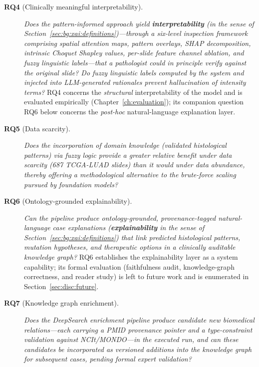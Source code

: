 \begin{description}
    \item[\textbf{RQ4} (Clinically meaningful interpretability).]
\emph{Does the pattern-informed approach yield
\textbf{interpretability} (in the sense of
Section~\ref{sec:bg:xai:definitions})---through a six-level
inspection framework comprising spatial attention maps, pattern
overlays, SHAP decomposition, intrinsic Choquet Shapley values,
per-slide feature channel ablation, and fuzzy linguistic
labels---that a pathologist could in principle verify against the
original slide?
Do fuzzy linguistic labels computed by the system and injected
into LLM-generated rationales prevent hallucination of intensity
terms?}
RQ4 concerns the \emph{structural} interpretability of the
model and is evaluated empirically
(Chapter~\ref{ch:evaluation}); its companion question
RQ6 below concerns the \emph{post-hoc} natural-language
explanation layer.
  \item[\textbf{RQ5} (Data scarcity).]
    \emph{Does the incorporation of domain knowledge (validated histological
    patterns) via fuzzy logic provide a greater relative benefit under data
    scarcity (687 TCGA-LUAD slides) than it would under data abundance, thereby
    offering a methodological alternative to the brute-force scaling pursued
    by foundation models?}
 
    \item[\textbf{RQ6} (Ontology-grounded explainability).]
    \emph{Can the pipeline produce ontology-grounded,
    provenance-tagged natural-language case explanations
    (\textbf{explainability} in the sense of
    Section~\ref{sec:bg:xai:definitions}) that link predicted
    histological patterns, mutation hypotheses, and therapeutic
    options in a clinically auditable knowledge graph?}
    RQ6 establishes the explainability layer as a system
    capability; its formal evaluation (faithfulness audit,
    knowledge-graph correctness, and reader study) is left to
    future work and is enumerated in
    Section~\ref{sec:disc:future}.
 
    \item[\textbf{RQ7} (Knowledge graph enrichment).]
    \emph{Does the DeepSearch enrichment pipeline produce candidate new
    biomedical relations---each carrying a PMID provenance pointer and
    a type-constraint validation against NCIt/MONDO---in the executed
    run, and can these candidates be incorporated as versioned
    additions into the knowledge graph for subsequent cases, pending
    formal expert validation?}

    
\end{description}

